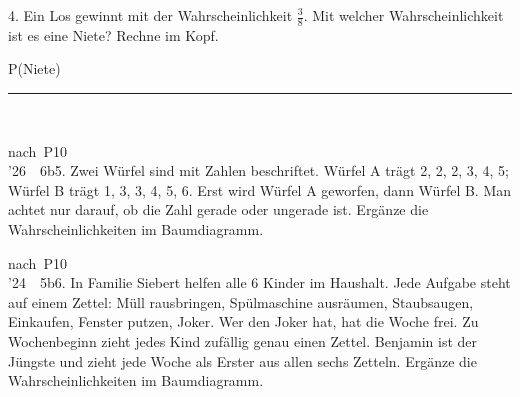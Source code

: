 \documentclass[11pt]{article}
\newcommand{\linie}[1]{\,{\color{black!45}\rule[-1pt]{#1}{0.4pt}}\,}
\newcommand{\pkt}{\textperiodcentered{}}
\begin{document}
\Needspace*{0.16\textheight}
\begin{pfaufg}{}{4.}{}
Ein Los gewinnt mit der Wahrscheinlichkeit $\tfrac{3}{8}$. Mit welcher Wahrscheinlichkeit ist es eine Niete? Rechne im Kopf.
\par\smallskip
\par\noindent P(Niete)\hfill\linie{30mm}
\par{}
\end{pfaufg}
\begin{pfaufg}{nach~P10\\’26~\pkt{}~6b}{5.}{}
Zwei Würfel sind mit Zahlen beschriftet. Würfel A trägt 2, 2, 2, 3, 4, 5; Würfel B trägt 1, 3, 3, 4, 5, 6. Erst wird Würfel A geworfen, dann Würfel B. Man achtet nur darauf, ob die Zahl gerade oder ungerade ist. Ergänze die Wahrscheinlichkeiten im Baumdiagramm.
\par\smallskip\noindent{}\par
{}
\end{pfaufg}
\begin{pfaufg}{nach~P10\\’24~\pkt{}~5b}{6.}{}
In Familie Siebert helfen alle 6 Kinder im Haushalt. Jede Aufgabe steht auf einem Zettel: Müll rausbringen, Spülmaschine ausräumen, Staubsaugen, Einkaufen, Fenster putzen, Joker. Wer den Joker hat, hat die Woche frei. Zu Wochenbeginn zieht jedes Kind zufällig genau einen Zettel. Benjamin ist der Jüngste und zieht jede Woche als Erster aus allen sechs Zetteln. Ergänze die Wahrscheinlichkeiten im Baumdiagramm.
\par\smallskip\noindent{}\par
{}
\end{pfaufg}
\end{document}
